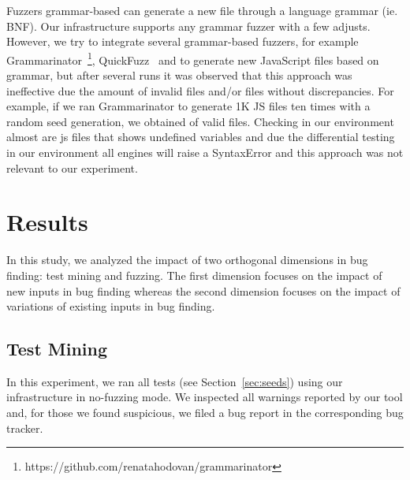 \documentclass[10pt,conference,anonymous]{IEEEtran}
\begin{document}
Fuzzers grammar-based can generate a new file through a language grammar (ie. BNF).
Our infrastructure supports any grammar fuzzer with a few adjusts. However, 
we try to integrate several grammar-based fuzzers, for example 
Grammarinator~\footnote{https://github.com/renatahodovan/grammarinator}, QuickFuzz~\cite{grieco2016quickfuzz}
and  to generate new JavaScript files based on grammar, but 
after several runs it was observed that this approach was ineffective
due the amount of invalid files and/or files without discrepancies. For example, if we ran 
Grammarinator to generate 1K JS files ten times with a random seed generation, we obtained
 of valid files. Checking in our environment almost 
are js files that shows undefined variables and due the differential testing in our environment
all engines will raise a SyntaxError and this approach was not relevant to our experiment.

\section{Results}
\label{sec:results}

In this study, we analyzed the impact of two orthogonal dimensions in
bug finding: test mining and fuzzing. The first dimension focuses on
the impact of new inputs in bug finding whereas the second dimension
focuses on the impact of variations of existing inputs in bug finding.

\subsection{Test Mining}

In this experiment, we ran all tests (see Section~\ref{sec:seeds})
using our infrastructure in no-fuzzing mode. We inspected all warnings
reported by our tool and, for those we found suspicious, we filed a
bug report in the corresponding bug tracker.


\end{document}
